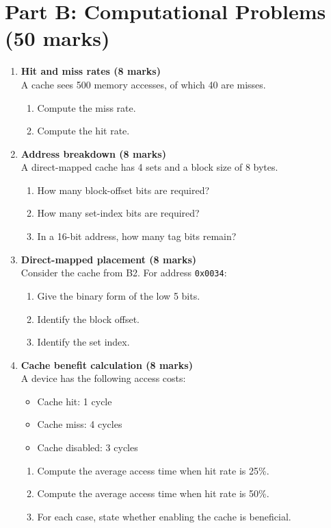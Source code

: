 \documentclass[11pt]{article}
\begin{document}
\section*{Part B: Computational Problems (50 marks)}
\begin{enumerate}[label=\textbf{B\arabic*.}]
  \item \textbf{Hit and miss rates (8 marks)}\\
  A cache sees 500 memory accesses, of which 40 are misses.
  \begin{enumerate}[label=(\alph*)]
    \item Compute the miss rate.
    \item Compute the hit rate.
  \end{enumerate}

  \item \textbf{Address breakdown (8 marks)}\\
  A direct-mapped cache has 4 sets and a block size of 8 bytes.
  \begin{enumerate}[label=(\alph*)]
    \item How many block-offset bits are required?
    \item How many set-index bits are required?
    \item In a 16-bit address, how many tag bits remain?
  \end{enumerate}

  \item \textbf{Direct-mapped placement (8 marks)}\\
  Consider the cache from B2. For address \texttt{0x0034}:
  \begin{enumerate}[label=(\alph*)]
    \item Give the binary form of the low 5 bits.
    \item Identify the block offset.
    \item Identify the set index.
  \end{enumerate}

  \item \textbf{Cache benefit calculation (8 marks)}\\
  A device has the following access costs:
  \begin{itemize}[leftmargin=1.5em]
    \item Cache hit: 1 cycle
    \item Cache miss: 4 cycles
    \item Cache disabled: 3 cycles
  \end{itemize}
  \begin{enumerate}[label=(\alph*)]
    \item Compute the average access time when hit rate is 25\%.
    \item Compute the average access time when hit rate is 50\%.
    \item For each case, state whether enabling the cache is beneficial.
  \end{enumerate}


\end{enumerate}
\end{document}
